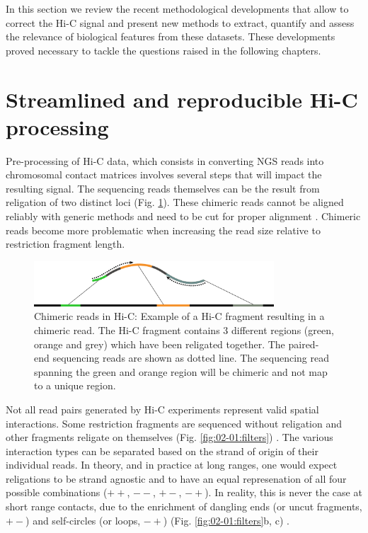 In this section we review the recent methodological developments that allow to correct the Hi-C signal and present new methods to extract, quantify and assess the relevance of biological features from these datasets. These developments proved necessary to tackle the questions raised in the following chapters.

\section{Streamlined and reproducible Hi-C processing}
\label{sec:02-01:streamlined-processing}

Pre-processing of Hi-C data, which consists in converting \acrfull{NGS} reads into chromosomal contact matrices involves several steps that will impact the resulting signal. The sequencing reads themselves can be the result from religation of two distinct loci (Fig. \ref{fig:02-01:chimeric}). These chimeric reads cannot be aligned reliably with generic methods and need to be cut for proper alignment \cite{lajoieHitchhikerGuideHiC2015}. Chimeric reads become more problematic when increasing the read size relative to restriction fragment length.

\begin{figure}[htb]
    \includegraphics[width=0.8\textwidth]{Parts/Part02/gfx/hicstuff/chimeric.pdf}
    \caption[Chimeric reads in Hi-C.]{Chimeric reads in Hi-C: Example of a Hi-C fragment resulting in a chimeric read. The Hi-C fragment contains 3 different regions (green, orange and grey) which have been religated together. The paired-end sequencing reads are shown as dotted line. The sequencing read spanning the green and orange region will be chimeric and not map to a unique region.}
    \label{fig:02-01:chimeric}
\end{figure}

Not all read pairs generated by Hi-C experiments represent valid spatial interactions. Some restriction fragments are sequenced without religation and other fragments religate on themselves (Fig. \ref{fig:02-01:filters}) \cite{cournacNormalizationChromosomalContact2012}. The various interaction types can be separated based on the strand of origin of their individual reads. In theory, and in practice at long ranges, one would expect religations to be strand agnostic and to have an equal represenation of all four possible combinations ($++$, $--$, $+-$, $-+$). In reality, this is never the case at short range contacts, due to the enrichment of dangling ends (or uncut fragments, $+-$) and self-circles (or loops, $-+$) (Fig. \ref{fig:02-01:filters}b, c) \cite{cournacNormalizationChromosomalContact2012}.

